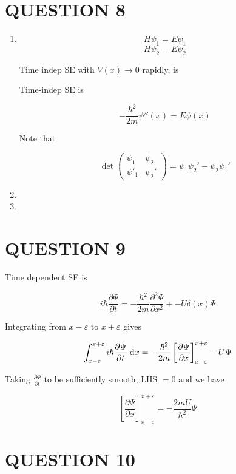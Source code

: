 \documentclass[a4paper]{article}
\begin{document}
\section{QUESTION 8}


\begin{enumerate}
	\item \[ H \psi_{1} = E \psi_{1} \]
	\[ H \psi_{2} = E \psi_{2} \]
	
	Time indep SE with $ V(x) \to 0 $ rapidly, is
	
	Time-indep SE is
	
	\[ - \frac{\hbar^{2}}{2m}\psi''(x)  = E \psi(x) \]
	
	Note that 
	
	\[ \det \begin{pmatrix}
	\psi_{1} & \psi_{2} \\
	\psi'_{1} & \psi_{2}'
	\end{pmatrix} = \psi_{1} \psi_{2}'  - \psi_{2} \psi_{1}'  \] 
	
	\item 
	\item
	
\end{enumerate}


\section{QUESTION 9}  

Time dependent SE is    

\[ i \hbar \frac{\partial \Psi }{\partial t} = - \frac{\hbar^{2}}{2m} \frac{\partial^{2} \Psi }{\partial x^{2}} + -U \delta(x) \Psi \]

Integrating from $ x - \varepsilon $ to $  x + \varepsilon $ gives

\[ \int_{x-\varepsilon}^{x+\varepsilon}  i \hbar \frac{\partial \Psi }{\partial t} \; \mathrm{d} x= - \frac{\hbar^{2}}{2m} \left[ \frac{\partial \Psi }{\partial x} \right]_{x - \varepsilon}^{x + \varepsilon} -  U \Psi  \]

Taking $ \frac{\partial \Psi }{\partial t} $ to be sufficiently smooth, LHS $ = 0 $ and we have

\[  \left[ \frac{\partial \Psi }{\partial x} \right]_{x - \varepsilon}^{x + \varepsilon} = -  \frac{2mU }{\hbar^{2}}  \Psi   \]



\section{QUESTION 10}
\end{document}
